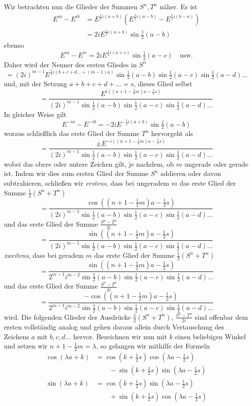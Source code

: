 Wir betrachten nun die Glieder der Summen $S^n,T^n$ näher. Es ist
\[
\begin{aligned}E^{ia}-E^{ib}&=E^{\frac12i(a+b)}(E^{\frac12i(a-b)}-E^{\frac12i(b-a)})\\
&=2iE^{\frac12i(a+b)}\sin\tfrac12(a-b)\end{aligned}
\]
ebenso
\[
E^{ia}-E^{ic}=2iE^{\frac12i(a+c)}\sin\tfrac12(a-c)\quad\text{usw.}
\]
Daher wird der Nenner des ersten Gliedes in $S^n$
\[
=(2i)^{m-1}E^{\frac12i(b+c+d\ldots+(m-1)a)}\sin\tfrac12(a-b)\sin\tfrac12(a-c)\sin\tfrac12(a-d)\ldots
\]
und, mit der Setzung $a+b+c+d+\ldots=s$, dieses Glied selbst
\[
=\frac{E^{i((n+1-\frac12m)a-\frac12s)}}{(2i)^{m-1}\sin\tfrac12(a-b)\sin\tfrac12(a-c)\sin\tfrac12(a-d)\ldots}
\]
In gleicher Weise gilt
\[
E^{-ia}-E^{-ib}=-2iE^{-\frac12i(a+b)}\sin\tfrac12(a-b)
\]
woraus schließlich das erste Glied der Summe $T^n$ hervorgeht als
\[
=\frac{\pm E^{-i((n+1-\frac12m)a-\frac12s)}}{(2i)^{m-1}\sin\tfrac12(a-b)\sin\tfrac12(a-c)\sin\tfrac12(a-d)\ldots}
\]
wobei das obere oder untere Zeichen gilt, je nachdem, ob $m$ ungerade oder gerade ist. Indem wir dies zum ersten Glied der Summe $S^n$ addieren oder davon subtrahieren, schließen wir \textit{erstens}, dass bei ungeradem $m$ das erste Glied der Summe $\frac12(S^n+T^n)$
\[
=\frac{\cos((n+1-\frac12m)a-\frac12s)}{(2i)^{m-1}\sin\tfrac12(a-b)\sin\tfrac12(a-c)\sin\tfrac12(a-d)\ldots}
\]
und das erste Glied der Summe $\frac{S^n-T^n}{2i}$
\[
=\frac{\sin((n+1-\frac12m)a-\frac12s)}{(2i)^{m-1}\sin\tfrac12(a-b)\sin\tfrac12(a-c)\sin\tfrac12(a-d)\ldots}
\]
\textit{zweitens}, dass bei geradem $m$ das erste Glied der Summe $\frac12(S^n+T^n)$
\[
=\frac{\sin((n+1-\frac12m)a-\frac12s)}{2^{m-1}i^{m-2}\sin\tfrac12(a-b)\sin\tfrac12(a-c)\sin\tfrac12(a-d)\ldots}
\]
und das erste Glied der Summe $\frac{S^n-T^n}{2i}$
\[
=\frac{-\cos((n+1-\frac12m)a-\frac12s)}{2^{m-1}i^{m-2}\sin\tfrac12(a-b)\sin\tfrac12(a-c)\sin\tfrac12(a-d)\ldots}
\]
wird. Die folgenden Glieder der Ausdrücke $\frac12(S^n+T^n)$, $\frac{S^n-T^n}{2i}$ sind offenbar dem ersten vollständig analog und gehen daraus allein durch Vertauschung des Zeichens $a$ mit $b,c,d\ldots$ hervor. Bezeichnen wir nun mit $k$ einen beliebigen Winkel und setzen wir $n+1-\frac12m=\lambda$, so gelangen wir mithilfe der Formeln
\[
\begin{aligned}
\cos(\lambda a+k)&=\cos(k+\tfrac12s)\cos(\lambda a-\tfrac12s)\\&\qquad-\sin(k+\tfrac12s)\sin(\lambda a-\tfrac12s)\\
\sin(\lambda a+k)&=\cos(k+\tfrac12s)\sin(\lambda a-\tfrac12s)\\&\qquad+\sin(k+\tfrac12s)\cos(\lambda a-\tfrac12s)
\end{aligned}
\]
